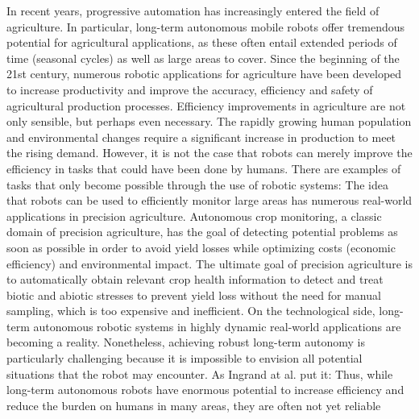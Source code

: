 \documentclass[english, master, utf8]{base/thesis_KBS}
\begin{document}
In recent years, progressive automation has increasingly entered the field of agriculture. In particular, long-term autonomous mobile robots offer tremendous potential for
agricultural applications, as these often entail extended periods of time (seasonal cycles) as well as large areas to cover. Since the beginning of the 21st century, numerous
robotic applications for agriculture have been developed to increase productivity and improve the accuracy, efficiency and safety of agricultural production processes. \cite{Xue:2010}
Efficiency improvements in agriculture are not only sensible, but perhaps even necessary. The rapidly growing human population and environmental changes require a significant
increase in production to meet the rising demand. \cite{Virlet:2016}\cite{KhakPour:2021}\cite{Roure:2018} However, it is not the case that robots can merely improve the efficiency
in tasks that could have been done by humans. There are examples of tasks that only become possible through the use of robotic systems:  \cite{Ampatzidis:2017} The idea that robots can be used to efficiently monitor
large areas has numerous real-world applications in precision agriculture. \cite{Bargoti:2015} Autonomous crop monitoring, a classic domain of precision agriculture, has the goal of
detecting potential problems as soon as possible in order to avoid yield losses while optimizing costs (economic efficiency) and environmental impact. \cite{Dong:2014}
\cite{Dong:2017} The ultimate goal of precision agriculture is to automatically obtain relevant crop health information to detect and treat biotic and abiotic stresses to prevent
yield loss without the need for manual sampling, which is too expensive and inefficient. \cite{Carlone:2015}\newline
On the technological side, long-term autonomous robotic systems in highly dynamic real-world applications are becoming a reality. \cite{Kunze:2018} Nonetheless, achieving robust
long-term autonomy is particularly challenging because it is impossible to envision all potential situations that the robot may encounter. \cite{Hawes:2017}
As Ingrand at al. put it:  \cite{Ingrand:2017}
Thus, while long-term autonomous robots have enormous potential to increase efficiency and reduce the burden on humans in many areas, they are often not yet reliable
\end{document}
